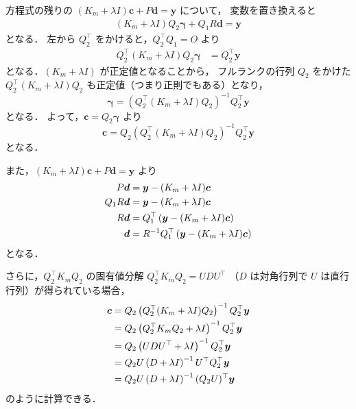 方程式の残りの $(K_m + \lambda I) \bm{c} + P \bm{d} = \bm{y}$ について，
変数を置き換えると
\begin{align}
    (K_m + \lambda I) Q_2 \bm{\gamma} + Q_1 R \bm{d} = \bm{y}
\end{align}
となる．
左から $Q_2^\top$ をかけると，$Q_2^\top Q_1 = O$ より
\begin{align}
    Q_2^\top (K_m + \lambda I) Q_2 \bm{\gamma} & = Q_2^\top \bm{y}
\end{align}
となる．$(K_m + \lambda I)$ が正定値となることから，
フルランクの行列 $Q_2$ をかけた $Q_2^\top (K_m + \lambda I) Q_2$ も正定値（つまり正則でもある）となり，
\begin{equation}
    \bm{\gamma} = \left( Q_2^\top (K_m + \lambda I) Q_2 \right)^{-1} Q_2^\top \bm{y}
\end{equation}
となる．
よって，$\bm{c} = Q_2 \bm{\gamma}$ より
\begin{equation}
    \bm{c} = Q_2 \left( Q_2^\top (K_m + \lambda I) Q_2 \right)^{-1} Q_2^\top \bm{y}
\end{equation}
となる．

また，$(K_m + \lambda I) \bm{c} + P \bm{d} = \bm{y}$ より
\begin{align}
    P \bm{d}     & = \bm{y} - (K_m + \lambda I) \bm{c} \notag                         \\
    Q_1 R \bm{d} & = \bm{y} - (K_m + \lambda I) \bm{c} \notag                         \\
    R \bm{d}     & = Q_1^\top \left( \bm{y} - (K_m + \lambda I) \bm{c} \right) \notag \\
    \bm{d}       & = R^{-1} Q_1^\top \left( \bm{y} - (K_m + \lambda I) \bm{c} \right)
\end{align}
となる．

さらに，$Q_2^\top K_m Q_2$ の固有値分解
$Q_2^\top K_m Q_2 = U D U^\top$ （$D$ は対角行列で $U$ は直行行列）が得られている場合，
\begin{align}
    \bm{c}
     & = Q_2 \left( Q_2^\top (K_m + \lambda I) Q_2 \right)^{-1} Q_2^\top \bm{y}
    \notag                                                                      \\
     & = Q_2 \left( Q_2^\top K_m Q_2 + \lambda I \right)^{-1} Q_2^\top \bm{y}
    \notag                                                                      \\
     & = Q_2 \left( U D U^\top + \lambda I \right)^{-1} Q_2^\top \bm{y}
    \notag                                                                      \\
     & = Q_2 U \left( D + \lambda I \right)^{-1} U^\top Q_2^\top \bm{y}
    \notag                                                                      \\
     & = Q_2 U \left( D + \lambda I \right)^{-1} (Q_2 U)^\top \bm{y}
\end{align}
のように計算できる．

